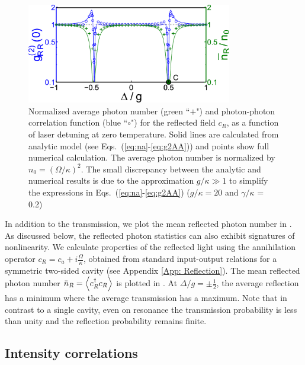 \begin{figure}
\centering
  \includegraphics[width=0.8\textwidth]{./figs_Komar2013/fig2c.pdf}
  \caption{
  \label{fig:spectrum_c}
  Normalized average photon number (green ``$+$")
  and photon-photon correlation function (blue ``$\circ$")
  for the reflected field $c_R$,
  as a function of laser detuning at zero temperature.
  Solid lines are calculated from analytic model
  (see Eqs.~(\ref{eq:na}-\ref{eq:g2AA}))
  and points show full numerical calculation.
  The average photon number is
  normalized by $n_0 = (\Omega/\kappa)^2$.
  The
  small discrepancy between the analytic and numerical results is due to the
  approximation $g/\kappa \gg 1$   to  
  simplify the expressions in Eqs.~(\ref{eq:na}-\ref{eq:g2AA})
  ($g/\kappa = 20$ and $\gamma/\kappa$ = 0.2)
  }
\end{figure}
 


In addition to the transmission,
we plot the mean reflected photon number
in  .
As discussed below, the reflected 
photon statistics
can also exhibit signatures of
nonlinearity.
We  calculate properties of the reflected light
using the
annihilation operator 
$c_R = c_a + i\frac{\Omega}{\kappa}$, obtained from standard input-output relations
for a symmetric two-sided cavity (see Appendix
\ref{App: Reflection}).
The mean reflected photon number
$\bar n_R = \left< c_R^\dagger c_R \right>$
is plotted in .
At $\Delta/g = \pm \frac{1}{2}$, 
the average reflection has a minimum where the
average transmission has a maximum. 
Note that in contrast to a single cavity, 
even on resonance the transmission probability
is less than unity and the reflection probability
remains finite.



\subsection{Intensity correlations}
\label{sec:onetime_correlation}


